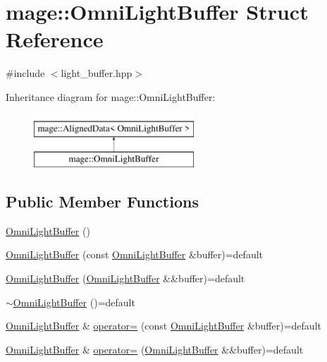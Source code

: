 \hypertarget{structmage_1_1_omni_light_buffer}{}\section{mage\+:\+:Omni\+Light\+Buffer Struct Reference}
\label{structmage_1_1_omni_light_buffer}


{\ttfamily \#include $<$light\+\_\+buffer.\+hpp$>$}

Inheritance diagram for mage\+:\+:Omni\+Light\+Buffer\+:\begin{figure}[H]
\begin{center}
\leavevmode
\includegraphics[height=2.000000cm]{structmage_1_1_omni_light_buffer}
\end{center}
\end{figure}
\subsection*{Public Member Functions}
\begin{DoxyCompactItemize}
\item 
\hyperlink{structmage_1_1_omni_light_buffer_a2cb95cb8ba07182d04b610b1c4c49be1}{Omni\+Light\+Buffer} ()
\item 
\hyperlink{structmage_1_1_omni_light_buffer_a199a9a711584abfe7576037ea479eccd}{Omni\+Light\+Buffer} (const \hyperlink{structmage_1_1_omni_light_buffer}{Omni\+Light\+Buffer} \&buffer)=default
\item 
\hyperlink{structmage_1_1_omni_light_buffer_a78c5a4066af4c60cf5579245d5f08f56}{Omni\+Light\+Buffer} (\hyperlink{structmage_1_1_omni_light_buffer}{Omni\+Light\+Buffer} \&\&buffer)=default
\item 
\hyperlink{structmage_1_1_omni_light_buffer_a80869a9637c8b3a40ee6da63b247faed}{$\sim$\+Omni\+Light\+Buffer} ()=default
\item 
\hyperlink{structmage_1_1_omni_light_buffer}{Omni\+Light\+Buffer} \& \hyperlink{structmage_1_1_omni_light_buffer_afc27989dfccb6bc8b58be462d35b989e}{operator=} (const \hyperlink{structmage_1_1_omni_light_buffer}{Omni\+Light\+Buffer} \&buffer)=default
\item 
\hyperlink{structmage_1_1_omni_light_buffer}{Omni\+Light\+Buffer} \& \hyperlink{structmage_1_1_omni_light_buffer_ae089377a7ddd063042848a360f2e0f49}{operator=} (\hyperlink{structmage_1_1_omni_light_buffer}{Omni\+Light\+Buffer} \&\&buffer)=default
\end{DoxyCompactItemize}
